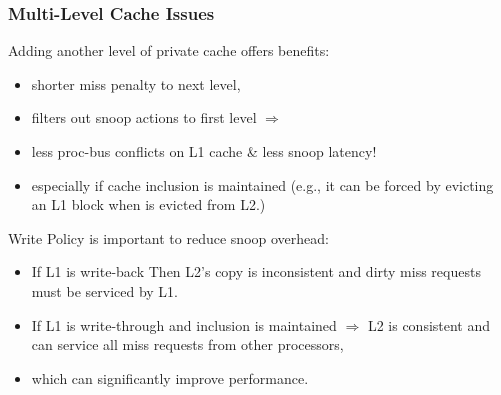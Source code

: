 \documentclass{beamer}
\renewcommand{\emph}[1]{\textcolor{structure}{#1}}
\begin{document}
\begin{frame}[fragile,t]
\frametitle{Multi-Level Cache Issues}

Adding another level of private cache offers benefits:
\begin{itemize} 
    \item shorter miss penalty to next level,
    \item filters out snoop actions to first level $\Rightarrow$
    \item \emph{less proc-bus conflicts on L1 cache \& less snoop latency!}
    \item especially if cache inclusion is maintained
            (e.g., it can be forced by evicting an L1 
            block when is evicted from L2.)
\end{itemize} 
\bigskip

Write Policy is important to reduce snoop overhead:
\begin{itemize}
    \item If L1 is write-back Then L2's copy is inconsistent and
            dirty miss requests must be serviced by L1.\pause
    \item \emph{If L1 is write-through and inclusion is maintained $\Rightarrow$
                L2 is consistent and can service all miss requests from
                other processors,}
    \item which can significantly improve performance.
\end{itemize}

\end{frame}

\end{document}
